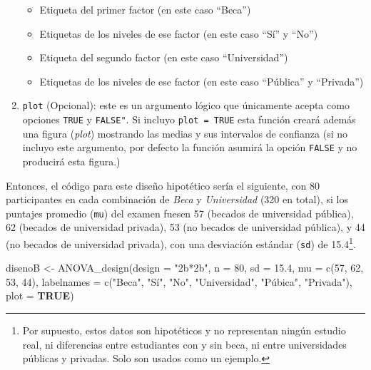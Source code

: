 \documentclass[
]{article}
\newenvironment{Shaded}{\begin{snugshade}}{\end{snugshade}}
\newcommand{\AttributeTok}[1]{\textcolor[rgb]{0.16,0.50,0.73}{#1}}
\newcommand{\ConstantTok}[1]{\textcolor[rgb]{0.15,0.68,0.68}{\textbf{#1}}}
\newcommand{\DecValTok}[1]{\textcolor[rgb]{0.96,0.45,0.00}{#1}}
\newcommand{\FloatTok}[1]{\textcolor[rgb]{0.96,0.45,0.00}{#1}}
\newcommand{\FunctionTok}[1]{\textcolor[rgb]{0.56,0.27,0.68}{#1}}
\newcommand{\NormalTok}[1]{\textcolor[rgb]{0.81,0.81,0.76}{#1}}
\newcommand{\OtherTok}[1]{\textcolor[rgb]{0.15,0.68,0.38}{#1}}
\newcommand{\StringTok}[1]{\textcolor[rgb]{0.96,0.31,0.31}{#1}}
\providecommand{\tightlist}{%
  \setlength{\itemsep}{0pt}\setlength{\parskip}{0pt}}
\begin{document}
\begin{enumerate}
  \begin{itemize}
  \tightlist
  \item
    Etiqueta del primer factor (en este caso ``Beca'')
  \item
    Etiquetas de los niveles de ese factor (en este caso ``Sí'' y
    ``No'')
  \item
    Etiqueta del segundo factor (en este caso ``Universidad'')
  \item
    Etiquetas de los niveles de ese factor (en este caso ``Pública'' y
    ``Privada'')
  \end{itemize}
\item
  \texttt{plot} (Opcional): este es un argumento lógico que únicamente
  acepta como opciones \texttt{TRUE} y \texttt{FALSE"}. Si incluyo
  \texttt{plot\ =\ TRUE} esta función creará además una figura
  (\emph{plot}) mostrando las medias y sus intervalos de confianza (si
  no incluyo este argumento, por defecto la función asumirá la opción
  \texttt{FALSE} y no producirá esta figura.)
\end{enumerate}

Entonces, el código para este diseño hipotético sería el siguiente, con
80 participantes en cada combinación de \emph{Beca} y \emph{Universidad}
(320 en total), si los puntajes promedio (\texttt{mu}) del examen fuesen
57 (becados de universidad pública), 62 (becados de universidad
privada), 53 (no becados de universidad pública), y 44 (no becados de
universidad privada), con una desviación estándar (\texttt{sd}) de
15.4\footnote{Por supuesto, estos datos son hipotéticos y no representan
  ningún estudio real, ni diferencias entre estudiantes con y sin beca,
  ni entre universidades públicas y privadas. Solo son usados como un
  ejemplo.}.

\begin{Shaded}
\begin{Highlighting}[]
\NormalTok{disenoB }\OtherTok{\textless{}{-}} \FunctionTok{ANOVA\_design}\NormalTok{(}\AttributeTok{design =} \StringTok{"2b*2b"}\NormalTok{,}
                       \AttributeTok{n =} \DecValTok{80}\NormalTok{, }\AttributeTok{sd =} \FloatTok{15.4}\NormalTok{,}
                       \AttributeTok{mu =} \FunctionTok{c}\NormalTok{(}\DecValTok{57}\NormalTok{, }\DecValTok{62}\NormalTok{, }\DecValTok{53}\NormalTok{, }\DecValTok{44}\NormalTok{),}
                       \AttributeTok{labelnames =} \FunctionTok{c}\NormalTok{(}\StringTok{"Beca"}\NormalTok{, }\StringTok{"Sí"}\NormalTok{, }\StringTok{"No"}\NormalTok{, }\StringTok{"Universidad"}\NormalTok{, }\StringTok{"Púbica"}\NormalTok{, }\StringTok{"Privada"}\NormalTok{),}
                       \AttributeTok{plot =} \ConstantTok{TRUE}\NormalTok{)}
\end{Highlighting}
\end{Shaded}
\end{document}
